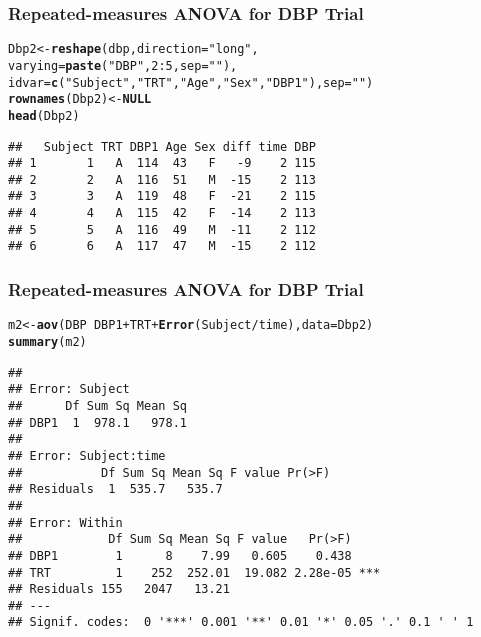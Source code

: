 \documentclass[table,10pt]{beamer}\usepackage[]{graphicx}\usepackage[]{color}
\makeatletter
\newcommand{\hlnum}[1]{\textcolor[rgb]{0.686,0.059,0.569}{#1}}%
\newcommand{\hlstr}[1]{\textcolor[rgb]{0.192,0.494,0.8}{#1}}%
\newcommand{\hlopt}[1]{\textcolor[rgb]{0,0,0}{#1}}%
\newcommand{\hlstd}[1]{\textcolor[rgb]{0.345,0.345,0.345}{#1}}%
\newcommand{\hlkwa}[1]{\textcolor[rgb]{0.161,0.373,0.58}{\textbf{#1}}}%
\newcommand{\hlkwb}[1]{\textcolor[rgb]{0.69,0.353,0.396}{#1}}%
\newcommand{\hlkwc}[1]{\textcolor[rgb]{0.333,0.667,0.333}{#1}}%
\newcommand{\hlkwd}[1]{\textcolor[rgb]{0.737,0.353,0.396}{\textbf{#1}}}%
\newenvironment{kframe}{%
 \def\at@end@of@kframe{}%
 \ifinner\ifhmode%
  \def\at@end@of@kframe{\end{minipage}}%
  \begin{minipage}{\columnwidth}%
 \fi\fi%
 \def\FrameCommand##1{\hskip\@totalleftmargin \hskip-\fboxsep
 \colorbox{shadecolor}{##1}\hskip-\fboxsep
     \hskip-\linewidth \hskip-\@totalleftmargin \hskip\columnwidth}%
 \MakeFramed {\advance\hsize-\width
   \@totalleftmargin\z@ \linewidth\hsize
   \@setminipage}}%
 {\par\unskip\endMakeFramed%
 \at@end@of@kframe}
\newenvironment{knitrout}{}{} %
\makeatother
\begin{document}
\begin{CJK*}{UTF8}{gbsn}
\begin{frame}[t,containsverbatim]
\frametitle{Repeated-measures ANOVA for DBP Trial}
\begin{knitrout}\footnotesize
{}\color{fgcolor}\begin{kframe}
\begin{alltt}
\hlstd{Dbp2} \hlkwb{<-} \hlkwd{reshape}\hlstd{(dbp,}\hlkwc{direction}\hlstd{=}\hlstr{"long"}\hlstd{,}
  \hlkwc{varying}\hlstd{=}\hlkwd{paste}\hlstd{(}\hlstr{"DBP"}\hlstd{,} \hlnum{2}\hlopt{:}\hlnum{5}\hlstd{,} \hlkwc{sep}\hlstd{=}\hlstr{""}\hlstd{),}
  \hlkwc{idvar} \hlstd{=} \hlkwd{c}\hlstd{(}\hlstr{"Subject"}\hlstd{,} \hlstr{"TRT"}\hlstd{,} \hlstr{"Age"}\hlstd{,} \hlstr{"Sex"}\hlstd{,} \hlstr{"DBP1"}\hlstd{),} \hlkwc{sep}\hlstd{=}\hlstr{""}\hlstd{)}
\hlkwd{rownames}\hlstd{(Dbp2)} \hlkwb{<-} \hlkwa{NULL}
\hlkwd{head}\hlstd{(Dbp2)}
\end{alltt}
\begin{verbatim}
##   Subject TRT DBP1 Age Sex diff time DBP
## 1       1   A  114  43   F   -9    2 115
## 2       2   A  116  51   M  -15    2 113
## 3       3   A  119  48   F  -21    2 115
## 4       4   A  115  42   F  -14    2 113
## 5       5   A  116  49   M  -11    2 112
## 6       6   A  117  47   M  -15    2 112
\end{verbatim}
\end{kframe}
\end{knitrout}
\end{frame}


\begin{frame}[t,containsverbatim]
\frametitle{Repeated-measures ANOVA for DBP Trial}
\begin{knitrout}\footnotesize
{}\color{fgcolor}\begin{kframe}
\begin{alltt}
\hlstd{m2} \hlkwb{<-} \hlkwd{aov}\hlstd{(DBP} \hlopt{~} \hlstd{DBP1} \hlopt{+} \hlstd{TRT} \hlopt{+} \hlkwd{Error}\hlstd{(Subject}\hlopt{/}\hlstd{time),} \hlkwc{data}\hlstd{=Dbp2)}
\hlkwd{summary}\hlstd{(m2)}
\end{alltt}
\begin{verbatim}
## 
## Error: Subject
##      Df Sum Sq Mean Sq
## DBP1  1  978.1   978.1
## 
## Error: Subject:time
##           Df Sum Sq Mean Sq F value Pr(>F)
## Residuals  1  535.7   535.7               
## 
## Error: Within
##            Df Sum Sq Mean Sq F value   Pr(>F)    
## DBP1        1      8    7.99   0.605    0.438    
## TRT         1    252  252.01  19.082 2.28e-05 ***
## Residuals 155   2047   13.21                     
## ---
## Signif. codes:  0 '***' 0.001 '**' 0.01 '*' 0.05 '.' 0.1 ' ' 1
\end{verbatim}
\end{kframe}
\end{knitrout}
\end{frame}



\end{CJK*}
\end{document}
